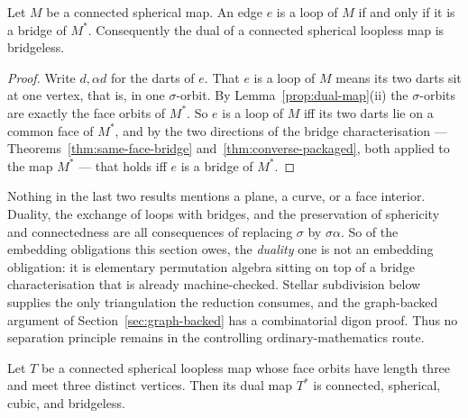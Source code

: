 \begin{corollary}\label{cor:loop-bridge}
Let $M$ be a connected spherical map.  An edge $e$ is a loop of $M$ if and
only if it is a bridge of $M^{*}$.  Consequently the dual of a connected
spherical loopless map is bridgeless.
\end{corollary}

\begin{proof}
Write $d, \alpha d$ for the darts of $e$. That $e$ is a loop of $M$ means its
two darts sit at one vertex, that is, in one $\sigma$-orbit. By
Lemma~\ref{prop:dual-map}(ii) the $\sigma$-orbits are exactly the face
orbits of $M^{*}$. So $e$ is a loop of $M$ iff its two darts lie on a common
face of $M^{*}$, and by the two directions of the bridge characterisation
--- Theorems~\ref{thm:same-face-bridge} and~\ref{thm:converse-packaged},
both applied to the map $M^{*}$ --- that holds iff $e$ is a bridge of
$M^{*}$.
\end{proof}

\begin{remark}
\Sprose
Nothing in the last two results mentions a plane, a curve, or a face
interior. Duality, the exchange of loops with bridges, and the preservation
of sphericity and connectedness are all consequences of replacing $\sigma$ by
$\sigma\alpha$. So of the embedding obligations this section owes, the
\emph{duality} one is not an embedding obligation: it is elementary
permutation algebra sitting on top of a bridge characterisation that is
already machine-checked.  Stellar subdivision below supplies the only
triangulation the reduction consumes, and the graph-backed argument of
Section~\ref{sec:graph-backed} has a combinatorial digon proof.  Thus no
separation principle remains in the controlling ordinary-mathematics route.
\end{remark}

\begin{lemma}\label{lem:dual-cubic}
\Sprose
Let $T$ be a connected spherical loopless map whose face orbits have length
three and meet three distinct vertices. Then its dual map $T^{*}$ is connected,
spherical, cubic, and bridgeless.
\end{lemma}

